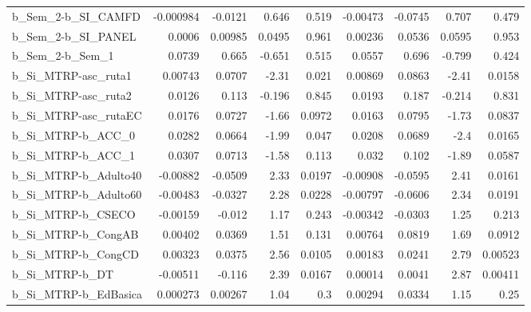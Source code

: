\begin{tabular}{lrrrrrrrr}
b\_Sem\_2-b\_SI\_CAMFD         &   -0.000984 &      -0.0121 &     0.646 &    0.519 &   -0.00473 &     -0.0745 &        0.707 &         0.479 \\
b\_Sem\_2-b\_SI\_PANEL         &      0.0006 &      0.00985 &    0.0495 &    0.961 &    0.00236 &      0.0536 &       0.0595 &         0.953 \\
b\_Sem\_2-b\_Sem\_1            &      0.0739 &        0.665 &    -0.651 &    0.515 &     0.0557 &       0.696 &       -0.799 &         0.424 \\
b\_Si\_MTRP-asc\_ruta1        &     0.00743 &       0.0707 &     -2.31 &    0.021 &    0.00869 &      0.0863 &        -2.41 &        0.0158 \\
b\_Si\_MTRP-asc\_ruta2        &      0.0126 &        0.113 &    -0.196 &    0.845 &     0.0193 &       0.187 &       -0.214 &         0.831 \\
b\_Si\_MTRP-asc\_rutaEC       &      0.0176 &       0.0727 &     -1.66 &   0.0972 &     0.0163 &      0.0795 &        -1.73 &        0.0837 \\
b\_Si\_MTRP-b\_ACC\_0          &      0.0282 &       0.0664 &     -1.99 &    0.047 &     0.0208 &      0.0689 &         -2.4 &        0.0165 \\
b\_Si\_MTRP-b\_ACC\_1          &      0.0307 &       0.0713 &     -1.58 &    0.113 &      0.032 &       0.102 &        -1.89 &        0.0587 \\
b\_Si\_MTRP-b\_Adulto40       &    -0.00882 &      -0.0509 &      2.33 &   0.0197 &   -0.00908 &     -0.0595 &         2.41 &        0.0161 \\
b\_Si\_MTRP-b\_Adulto60       &    -0.00483 &      -0.0327 &      2.28 &   0.0228 &   -0.00797 &     -0.0606 &         2.34 &        0.0191 \\
b\_Si\_MTRP-b\_CSECO          &    -0.00159 &       -0.012 &      1.17 &    0.243 &   -0.00342 &     -0.0303 &         1.25 &         0.213 \\
b\_Si\_MTRP-b\_CongAB         &     0.00402 &       0.0369 &      1.51 &    0.131 &    0.00764 &      0.0819 &         1.69 &        0.0912 \\
b\_Si\_MTRP-b\_CongCD         &     0.00323 &       0.0375 &      2.56 &   0.0105 &    0.00183 &      0.0241 &         2.79 &       0.00523 \\
b\_Si\_MTRP-b\_DT             &    -0.00511 &       -0.116 &      2.39 &   0.0167 &    0.00014 &      0.0041 &         2.87 &       0.00411 \\
b\_Si\_MTRP-b\_EdBasica       &    0.000273 &      0.00267 &      1.04 &      0.3 &    0.00294 &      0.0334 &         1.15 &          0.25 \\

\end{tabular}
